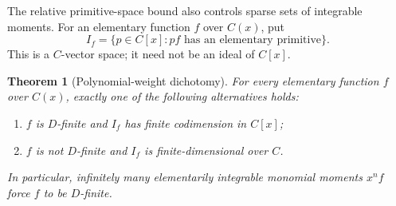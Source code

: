 \documentclass[11pt,a4paper]{article}
\newtheorem{theorem}{Theorem}[section]
\theoremstyle{definition}
\theoremstyle{remark}
\numberwithin{equation}{section}
\begin{document}
The relative primitive-space bound also controls sparse sets of
integrable moments.  For an elementary function $f$ over $C(x)$, put
\[
 I_f=\{p\in C[x]:pf\text{ has an elementary primitive}\}.
\]
This is a $C$-vector space; it need not be an ideal of $C[x]$.

\begin{theorem}[Polynomial-weight dichotomy]
\label{stab:weight-dichotomy}
For every elementary function $f$ over $C(x)$, exactly one of the
following alternatives holds:
\begin{enumerate}
\item $f$ is $D$-finite and $I_f$ has finite codimension in $C[x]$;
\item $f$ is not $D$-finite and $I_f$ is finite-dimensional over $C$.
\end{enumerate}
In particular, infinitely many elementarily integrable monomial moments
$x^n f$ force $f$ to be $D$-finite.
\end{theorem}
\end{document}
